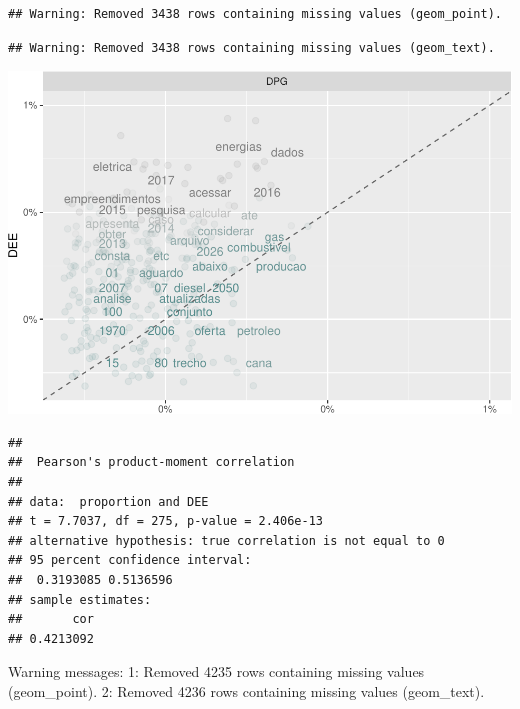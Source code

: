 \documentclass[]{article}
\newenvironment{Shaded}{\begin{snugshade}}{\end{snugshade}}
\newcommand{\KeywordTok}[1]{\textcolor[rgb]{0.13,0.29,0.53}{\textbf{#1}}}
\newcommand{\DataTypeTok}[1]{\textcolor[rgb]{0.13,0.29,0.53}{#1}}
\newcommand{\StringTok}[1]{\textcolor[rgb]{0.31,0.60,0.02}{#1}}
\newcommand{\FunctionTok}[1]{\textcolor[rgb]{0.00,0.00,0.00}{#1}}
\newcommand{\OperatorTok}[1]{\textcolor[rgb]{0.81,0.36,0.00}{\textbf{#1}}}
\newcommand{\AttributeTok}[1]{\textcolor[rgb]{0.77,0.63,0.00}{#1}}
\newcommand{\NormalTok}[1]{#1}
\begin{document}
\begin{verbatim}
## Warning: Removed 3438 rows containing missing values (geom_point).
\end{verbatim}

\begin{verbatim}
## Warning: Removed 3438 rows containing missing values (geom_text).
\end{verbatim}

\includegraphics{markdown_v31_files/figure-latex/unnamed-chunk-55-1.pdf}

\begin{Shaded}
\end{Shaded}

\begin{verbatim}
## 
##  Pearson's product-moment correlation
## 
## data:  proportion and DEE
## t = 7.7037, df = 275, p-value = 2.406e-13
## alternative hypothesis: true correlation is not equal to 0
## 95 percent confidence interval:
##  0.3193085 0.5136596
## sample estimates:
##       cor 
## 0.4213092
\end{verbatim}

\begin{Shaded}
\begin{Highlighting}[]
\FunctionTok{Warning messages:}
\FunctionTok{1:}\AttributeTok{ Removed 4235 rows containing missing values (geom_point). }
\FunctionTok{2:}\AttributeTok{ Removed 4236 rows containing missing values (geom_text). }
\end{Highlighting}
\end{Shaded}
\end{document}
